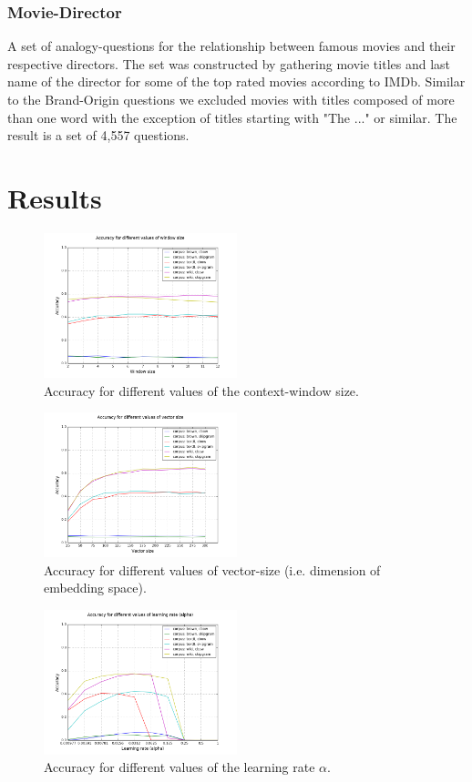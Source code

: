 \documentclass[conference]{IEEEtran}
\begin{document}
\subsubsection{Movie-Director}
A set of analogy-questions for the relationship between famous movies and their respective 
directors. The set was constructed by gathering movie titles and last name of the director for 
some of the top rated movies according to IMDb. Similar to the Brand-Origin questions we 
excluded movies with titles composed of more than one word with the exception of titles
starting with "The ..." or similar.  The result is a set of 4,557 questions.


\section{Results}
\label{sec:res}

\begin{figure}[t]
\centering
\includegraphics[width=0.5\textwidth]{graph_acc_window}
\caption{Accuracy for different values of the context-window size. }
\label{fig:window}
\end{figure}

\begin{figure}[t]
\centering
\includegraphics[width=0.5\textwidth]{graph_acc_size}
\caption{Accuracy for different values of vector-size (i.e. dimension of embedding space). }
\label{fig:size}
\end{figure}

\begin{figure}[t]
\centering
\includegraphics[width=0.5\textwidth]{graph_acc_alpha}
\caption{Accuracy for different values of the learning rate $\alpha$. }
\label{fig:alpha}
\end{figure}
\end{document}
